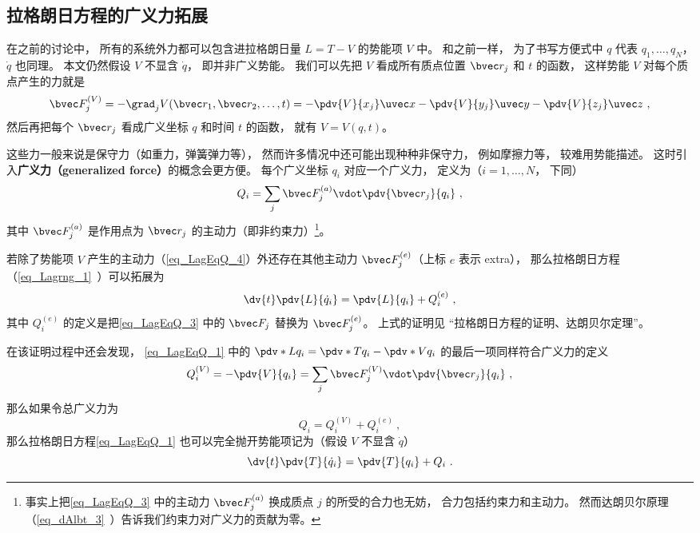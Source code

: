 

\subsection{拉格朗日方程的广义力拓展}
在之前的讨论中， 所有的系统外力都可以包含进拉格朗日量 $L = T-V$ 的势能项 $V$ 中。 和之前一样， 为了书写方便式中 $q$ 代表 $q_1, \dots, q_N$， $\dot q$ 也同理。 本文仍然假设 $V$ 不显含 $\dot q$， 即并非广义势能。 我们可以先把 $V$ 看成所有质点位置 $\bvec r_j$ 和 $t$ 的函数， 这样势能 $V$ 对每个质点产生的力就是
\begin{equation}\label{eq_LagEqQ_4}
\bvec F_j^{(V)} = - \grad_j V(\bvec r_1,\bvec r_2,\dots,t) = -\pdv{V}{x_j}\uvec x - \pdv{V}{y_j}\uvec y - \pdv{V}{z_j} \uvec z~,
\end{equation}
然后再把每个 $\bvec r_j$ 看成广义坐标 $q$ 和时间 $t$ 的函数， 就有 $V = V(q,t)$。

这些力一般来说是保守力（如重力，弹簧弹力等）， 然而许多情况中还可能出现种种非保守力， 例如摩擦力等， 较难用势能描述。 这时引入\textbf{广义力（generalized force）}的概念会更方便。 每个广义坐标 $q_i$ 对应一个广义力， 定义为（$i=1,\dots,N$， 下同）
\begin{equation}\label{eq_LagEqQ_3}
Q_i = \sum_j \bvec F_j^{(a)} \vdot \pdv{\bvec r_j}{q_i}~,
\end{equation}
其中 $\bvec F_j^{(a)}$ 是作用点为 $\bvec r_j$ 的主动力（即非约束力）\footnote{事实上把\autoref{eq_LagEqQ_3} 中的主动力 $\bvec F_j^{(a)}$ 换成质点 $j$ 的所受的合力也无妨， 合力包括约束力和主动力。 然而达朗贝尔原理（\autoref{eq_dAlbt_3}~）告诉我们约束力对广义力的贡献为零。}。

若除了势能项 $V$ 产生的主动力（\autoref{eq_LagEqQ_4}）外还存在其他主动力 $\bvec F_j^{(e)}$（上标 $e$ 表示 extra）， 那么拉格朗日方程（\autoref{eq_Lagrng_1}~）可以拓展为
\begin{equation}\label{eq_LagEqQ_1}
\dv{t} \pdv{L}{\dot q_i} = \pdv{L}{q_i} + Q_i^{(e)}~,
\end{equation}
其中 $Q_i^{(e)}$ 的定义是把\autoref{eq_LagEqQ_3} 中的 $\bvec F_j$ 替换为 $\bvec F_j^{(e)}$。 上式的证明见 “拉格朗日方程的证明、达朗贝尔定理”。

在该证明过程中还会发现， \autoref{eq_LagEqQ_1} 中的 $\pdv*{L}{q_i} = \pdv*{T}{q_i} - \pdv*{V}{q_i}$ 的最后一项同样符合广义力的定义
\begin{equation}
Q_i^{(V)} = -\pdv{V}{q_i} = \sum_j \bvec F_j^{(V)} \vdot \pdv{\bvec r_j}{q_i}~,
\end{equation}
那么如果令总广义力为
\begin{equation}
Q_i = Q_i^{(V)} + Q_i^{(e)}~,
\end{equation}
那么拉格朗日方程\autoref{eq_LagEqQ_1} 也可以完全抛开势能项记为（假设 $V$ 不显含 $\dot q$）
\begin{equation}\label{eq_LagEqQ_2}
\dv{t} \pdv{T}{\dot q_i} = \pdv{T}{q_i} + Q_i~.
\end{equation}


